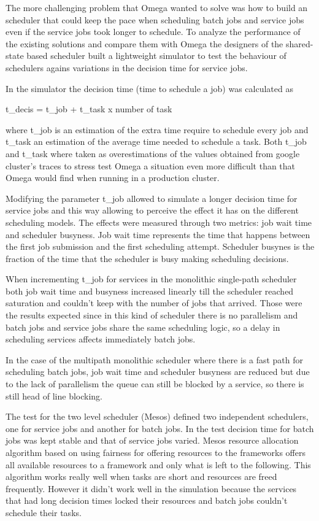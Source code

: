 \documentclass{svjour3}                     %
\begin{document}
The more challenging problem that Omega wanted to solve was how
to build an scheduler that could keep the pace when scheduling batch
jobs and service jobs even if the service jobs took longer to
schedule. To analyze the performance of the existing solutions and
compare them with Omega the designers of the shared-state based
scheduler built a lightweight simulator to test the behaviour of
schedulers agains variations in the decision time for service jobs.

In the simulator the decision time (time to schedule a job) was
calculated as

t\_{decis} = t\_{job} + t\_{task} x number of task

where t\_{job} is an estimation of the extra time require to schedule
every job and t\_{task} an estimation of the average time needed to
schedule a task. Both t\_{job} and t\_{task} where taken as
overestimations of the values obtained from google cluster's traces
\cite{37201} to stress test Omega a situation even more difficult than that
Omega would find when running in a production cluster.

Modifying the parameter t\_{job} allowed to simulate a longer decision
time for service jobs and this way allowing to perceive the effect it
has on the different scheduling models. The effects were measured
through two metrics: job wait time and scheduler busyness. Job wait
time represents the time that happens between the first job submission
and the first scheduling attempt. Scheduler busynes is the fraction of
the time that the scheduler is busy making scheduling decisions.

When incrementing t\_{job} for services in the monolithic single-path
scheduler both job wait time and busyness increased linearly till the
scheduler reached saturation and couldn't keep with the number of jobs
that arrived. Those were the results expected since in this kind of
scheduler there is no parallelism and batch jobs and service jobs share
the same scheduling logic, so a delay in scheduling services affects
immediately batch jobs.

In the case of the multipath monolithic scheduler where there is
a fast path for scheduling batch jobs, job wait time and scheduler
busyness are reduced but due to the lack of parallelism the queue can
still be blocked by a service, so there is still head of line blocking.

The test for the two level scheduler (Mesos) defined two independent
schedulers, one for service jobs and another for batch jobs. In the
test decision time for batch jobs was kept stable and that of service
jobs varied. Mesos resource allocation algorithm based on using
fairness for offering resources to the frameworks offers all available
resources to a framework and only what is left to the following. This
algorithm works really well when tasks are short and resources are
freed frequently. However it didn't work well in the simulation
because the services that had long decision times locked their
resources and batch jobs couldn't schedule their tasks.
\end{document}
